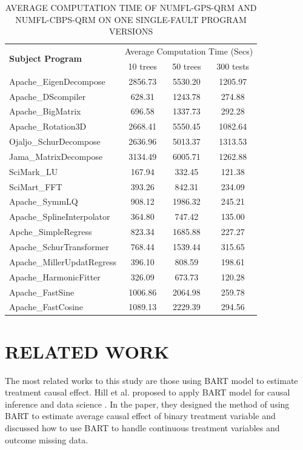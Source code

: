 \begin{table}[htbp!]
\caption{AVERAGE COMPUTATION TIME OF NUMFL-GPS-QRM AND NUMFL-CBPS-QRM ON ONE SINGLE-FAULT PROGRAM VERSIONS }
\label{BARTcomputetime}
\centering
      \begin{tabular}{|l|c|c|c|}
      \hline
\multirow{2}{*}{{\bf Subject Program}}	&	\multicolumn{3}{|c|}{Average Computation Time (Secs)}	\\	\cline{2-4}
& 10 trees & 50 trees & 300 tests\\ \hline

Apache\_EigenDecompose	&	2856.73	&	5530.20	&	1205.97	\\ \hline
Apache\_DScompiler	&	628.31	&	1243.78	&	274.88	\\ \hline
Apache\_BigMatrix	&	696.58	&	1337.73	&	292.28	\\ \hline
Apache\_Rotation3D	&	2668.41	&	5550.45	&	1082.64	\\ \hline
Ojaljo\_SchurDecompose	&	2636.96	&	5013.37	&	1313.53	\\ \hline
Jama\_MatrixDecompose	&	3134.49	&	6005.71	&	1262.88	\\ \hline
SciMark\_LU	&	167.94	&	332.45	&	121.38	\\ \hline
SciMart\_FFT	&	393.26	&	842.31	&	234.09	\\ \hline
Apache\_SymmLQ	&	908.12	&	1986.32	&	245.21	\\ \hline
Apache\_SplineInterpolator	&	364.80	&	747.42	&	135.00	\\ \hline
Apche\_SimpleRegress	&	823.34	&	1685.88	&	227.27	\\ \hline
Apache\_SchurTransformer	&	768.44	&	1539.44	&	315.65	\\ \hline
Apache\_MillerUpdatRegress	&	396.10	&	808.59	&	198.61	\\ \hline
Apache\_HarmonicFitter	&	326.09	&	673.73	&	120.28	\\ \hline
Apache\_FastSine	&	1006.86	&	2064.98	&	259.78	\\ \hline
Apache\_FastCosine	&	1089.13	&	2229.39	&	294.56	\\ \hline
\end{tabular}
\end{table}

\section{RELATED WORK}\label{BARTrelatedwork}
The most related works to this study are those using BART model to estimate treatment causal effect. Hill et al. proposed to apply BART model for causal inference and data science \cite{}. In the paper, they designed the method of using BART to estimate average causal effect of binary treatment variable and discussed how to use BART to handle continuous treatment variables and outcome missing data.

